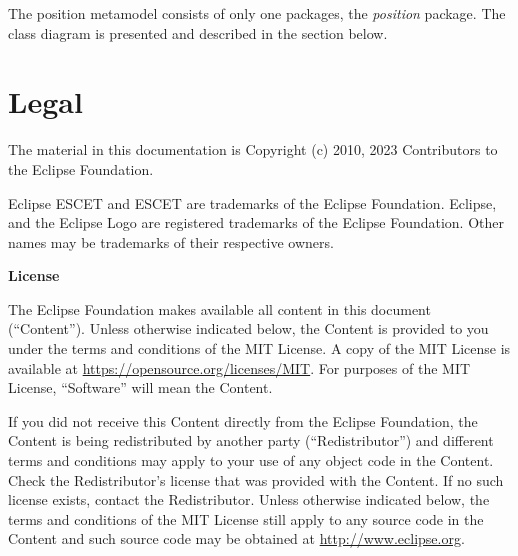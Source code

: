 \documentclass{report}
\begin{document}
The position metamodel consists of only one packages, the \emph{position}
package. The class diagram is presented and described in the section
below.





\chapter{Legal}

The material in this documentation is
Copyright (c) 2010, 2023 Contributors to the Eclipse Foundation.

Eclipse ESCET and ESCET are trademarks of the Eclipse Foundation.
Eclipse, and the Eclipse Logo are registered trademarks of the
Eclipse Foundation. Other names may be trademarks of their
respective owners.

\textbf{License}

The Eclipse Foundation makes available all content in this document
(``Content''). Unless otherwise indicated below, the Content is provided to you
under the terms and conditions of the MIT License. A copy of the MIT License
is available at \url{https://opensource.org/licenses/MIT}. For purposes of the
MIT License, ``Software'' will mean the Content.

If you did not receive this Content directly from the Eclipse Foundation,
the Content is being redistributed by another party (``Redistributor'') and
different terms and conditions may apply to your use of any object code in
the Content. Check the Redistributor's license that was provided with the
Content. If no such license exists, contact the Redistributor. Unless
otherwise indicated below, the terms and conditions of the MIT License
still apply to any source code in the Content and such source code may be
obtained at \url{http://www.eclipse.org}.





\end{document}
